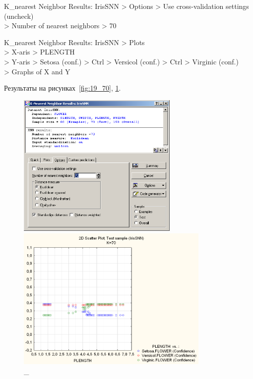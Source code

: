 \newpage

K\_nearest Neighbor Results: IrisSNN > Options > Use cross-validation settings (uncheck) \\
> Number of nearest neighbors > 70

K\_nearest Neighbor Results: IrisSNN > Plots \\
> X-aris > PLENGTH \\
> Y-aris > Setosa (conf.) > Ctrl > Versicol (conf.) > Ctrl > Virginic (conf.) \\
> Graphs of X and Y

Результаты на рисунках~\ref{fig:19_70}, \ref{fig:20_70}.

\begin{figure}[!h]
  \centering

  \begin{minipage}{0.49\textwidth}
    \centering

    \includegraphics[height=7cm]
    {inc/ex_26.PNG}

    \caption{\_}

    \label{fig:19_70}
  \end{minipage}
  \begin{minipage}{0.49\textwidth}
    \centering

    \includegraphics[height=7cm]
    {inc/ex_27.PNG}

    \caption{\_}

    \label{fig:20_70}
  \end{minipage}
\end{figure}

